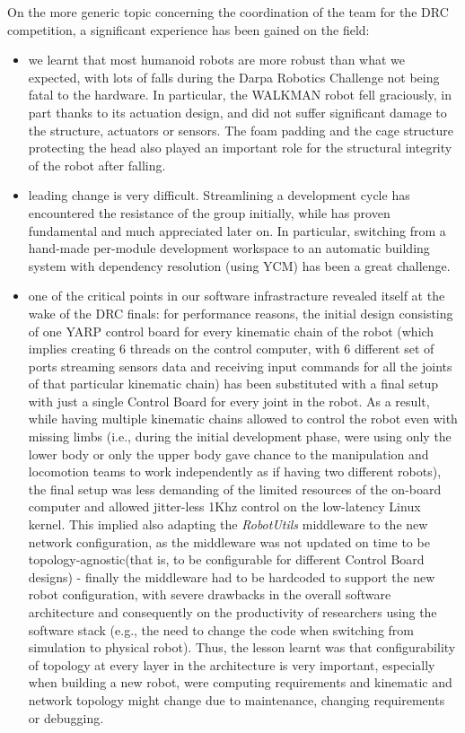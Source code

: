 \documentclass[%
	paper=A4,					%
	twoside=true,				%
	openright,			.
	parskip=full,				%
	chapterprefix=true,			%
	11pt,						%
	headings=normal,			%
	bibliography=totoc,			%
	listof=totoc,				%
	titlepage=on,				%
	captions=tableabove,		%
	draft=true,				%
]{scrreprt}%
\begin{document}
On the more generic topic concerning the coordination of the team for the DRC competition, a significant experience has been gained on the field:
\begin{itemize}
 \item we learnt that most humanoid robots are more robust than what we expected, with lots of falls during the Darpa Robotics Challenge not being fatal to the hardware. In particular, the WALKMAN robot fell graciously, in part thanks to its actuation design, and did not suffer significant damage to the structure, actuators or sensors. The foam padding and the cage structure protecting the head also played an important role for the structural integrity of the robot after falling.
 \item leading change is very difficult. Streamlining a development cycle has encountered the resistance of the group initially, while has proven fundamental and much appreciated later on. In particular, switching from a hand-made per-module development workspace to an automatic building system with dependency resolution (using YCM) has been a great challenge.
 \item one of the critical points in our software infrastracture revealed itself at the wake of the DRC finals: for performance reasons, the initial design consisting of one YARP control board for every kinematic chain of the robot (which implies creating 6 threads on the control computer, with 6 different set of ports streaming sensors data and receiving input commands for all the joints of that particular kinematic chain) has been substituted with a final setup with just a single Control Board for every joint in the robot. As a result, while having multiple kinematic chains allowed to control the robot even with missing limbs (i.e., during the initial development phase, were using only the lower body or only the upper body gave chance to the manipulation and locomotion teams to work independently as if having two different robots), the final setup was less demanding of the limited resources of the on-board computer and allowed jitter-less 1Khz control on the low-latency Linux kernel. This implied also adapting the \emph{RobotUtils} middleware to the new network configuration, as the middleware was not updated on time to be topology-agnostic(that is, to be configurable for different Control Board designs) - finally the middleware had to be hardcoded to support the new robot configuration, with severe drawbacks in the overall software architecture and consequently on the productivity of researchers using the software stack (e.g., the need to change the code when switching from simulation to physical robot). Thus, the lesson learnt was that configurability of topology at every layer in the architecture is very important, especially when building a new robot, were computing requirements and kinematic and network topology might change due to maintenance, changing requirements or debugging.
\end{itemize}
\end{document}
